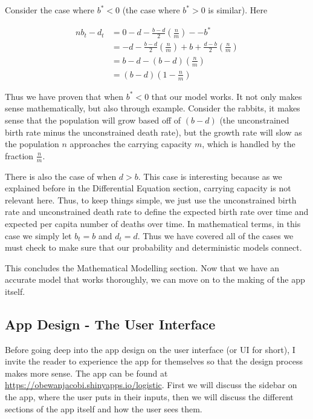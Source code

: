 \documentclass[titlepage]{article}\usepackage[]{graphicx}\usepackage[]{color}
\begin{document}
Consider the case where \(b^* < 0\) (the case where \(b^* > 0\) is similar). Here

\begin{equation}
\begin{split}
nb_t - d_t & = 0 - d - \frac{b-d}{2} \left(\frac{n}{m}\right)- -b^* \\ 
& = -d-\frac{b-d}{2} \left(\frac{n}{m}\right) +b + \frac{d-b}{2} \left(\frac{n}{m}\right) \\
& = b-d-(b-d)\left(\frac{n}{m}\right) \\
& =(b-d)\left(1-\frac{n}{m}\right)
\end{split}
\end{equation}

\noindent Thus we have proven that when \(b^* < 0\) that our model works. It not only makes sense mathematically, but also through example. Consider the rabbits, it makes sense that the population will grow based off of \((b-d)\) (the unconstrained birth rate minus the unconstrained death rate), but the growth rate will slow as the population \(n\) approaches the carrying capacity \(m\), which is handled by the fraction \(\frac{n}{m}\). 

There is also the case of when \(d>b\). This case is interesting because as we explained before in the Differential Equation section, carrying capacity is not relevant here. Thus, to keep things simple, we just use the unconstrained birth rate and unconstrained death rate to define the expected birth rate over time and expected per capita number of deaths over time. In mathematical terms, in this case we simply let \(b_t = b\) and \(d_t=d\). Thus we have covered all of the cases we must check to make sure that our probability and deterministic models connect. 

This concludes the Mathematical Modelling section. Now that we have an accurate model that works thoroughly, we can move on to the making of the app itself. 










\subsection{App Design - The User Interface}

Before going deep into the app design on the user interface (or UI for short), I invite the reader to experience the app for themselves so that the design process makes more sense. The app can be found at \url{https://obewanjacobi.shinyapps.io/logistic}. First we will discuss the sidebar on the app, where the user puts in their inputs, then we will discuss the different sections of the app itself and how the user sees them.
\end{document}
